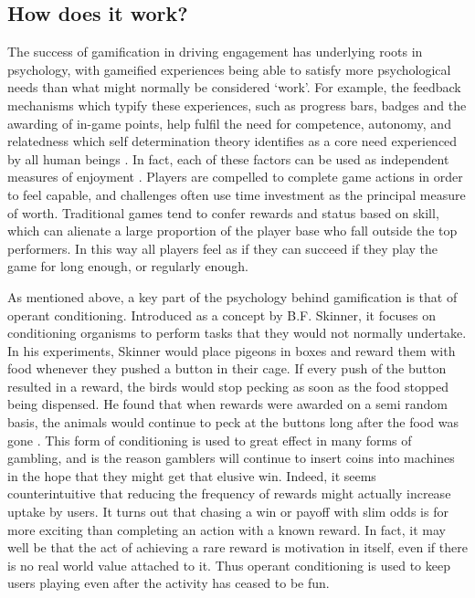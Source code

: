 \documentclass[12pt]{article}
\begin{document}
\subsection{How does it work?}
The success of gamification in driving engagement has underlying roots in psychology, with gameified experiences being able to satisfy more psychological needs than what might normally be considered `work'. For example, the feedback mechanisms which typify these experiences, such as progress bars, badges and the awarding of in-game points, help fulfil the need for competence, autonomy, and relatedness which self determination theory identifies as a core need experienced by all human beings \cite{przybylski2010motivational}. In fact, each of these factors can be used as independent measures of enjoyment \cite{kapp2012gamification}. Players are compelled to complete game actions in order to feel capable, and challenges often use time investment as the principal measure of worth. Traditional games tend to confer rewards and status based on skill, which can alienate a large proportion of the player base who fall outside the top performers. In this way all players feel as if they can succeed if they play the game for long enough, or regularly enough.

As mentioned above, a key part of the psychology behind gamification is that of operant conditioning. Introduced as a concept by B.F. Skinner, it focuses on conditioning organisms to perform tasks that they would not normally undertake. In his experiments, Skinner would place pigeons in boxes and reward them with food whenever they pushed a button in their cage. If every push of the button resulted in a reward, the birds would stop pecking as soon as the food stopped being dispensed. He found that when rewards were awarded on a semi random basis, the animals would continue to peck at the buttons long after the food was gone \cite{kapp2012gamification}. This form of conditioning is used to great effect in many forms of gambling, and is the reason gamblers will continue to insert coins into machines in the hope that they might get that elusive win. Indeed, it seems counterintuitive that reducing the frequency of rewards might actually increase uptake by users. It turns out that chasing a win or payoff with slim odds is for more exciting than completing an action with a known reward. In fact, it may well be that the act of achieving a rare reward is motivation in itself, even if there is no real world value attached to it. Thus operant conditioning is used to keep users playing even after the activity has ceased to be fun.
\end{document}
